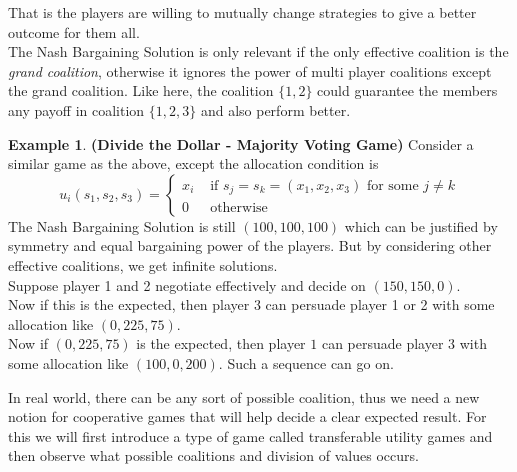 \documentclass{article}
\theoremstyle{definition}
\newtheorem{example}{Example}[section]
\begin{document}
That is the players are willing to mutually change strategies to give a better outcome for them all.\\
The Nash Bargaining Solution is only relevant if the only effective coalition is the \textit{grand coalition}, otherwise it ignores the power of multi player coalitions except the grand coalition. Like here, the coalition $\{1,2\}$ could guarantee the members any payoff in coalition $\{1,2,3\}$ and also perform better.
\begin{example}
\textbf{(Divide the Dollar - Majority Voting Game)}
Consider a similar game as the above, except the allocation condition is 
\[u_i(s_1,s_2,s_3) =
\begin{cases}
x_i &\text{ if }s_j = s_k = (x_1,x_2,x_3) \text{ for some } j\neq k\\
0 &\text{ otherwise}
\end{cases}
\]
The Nash Bargaining Solution is still $(100,100,100)$ which can be justified by symmetry and equal bargaining power of the players. But by considering other effective coalitions, we get infinite solutions.\\
Suppose player 1 and 2 negotiate effectively and decide on $(150,150,0)$.\\
Now if this is the expected, then player 3 can persuade player 1 or 2 with some allocation like $(0,225,75)$.\\
Now if $(0,225,75)$ is the expected, then player $1$ can persuade player $3$ with some allocation like $(100,0,200)$. Such a sequence can go on.
\end{example}
In real world, there can be any sort of possible coalition, thus we need a new notion for cooperative games that will help decide a clear expected result. For this we will first introduce a type of game called transferable utility games and then observe what possible coalitions and division of values occurs.
\end{document}
